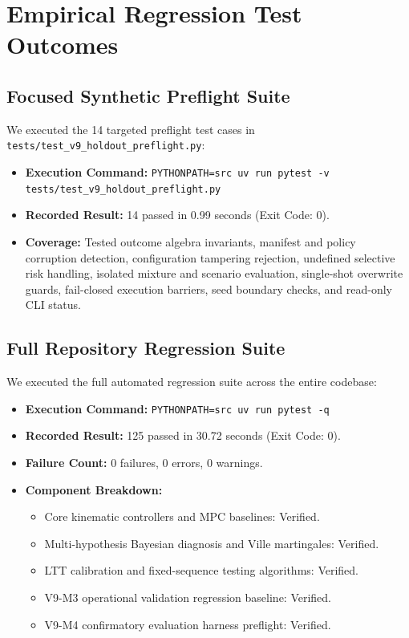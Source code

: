 \documentclass[10pt,a4paper]{article}
\begin{document}
\section{Empirical Regression Test Outcomes}

\subsection{Focused Synthetic Preflight Suite}
We executed the 14 targeted preflight test cases in \texttt{tests/test\_v9\_holdout\_preflight.py}:
\begin{itemize}
    \item \textbf{Execution Command:} \texttt{PYTHONPATH=src uv run pytest -v tests/test\_v9\_holdout\_preflight.py}
    \item \textbf{Recorded Result:} 14 passed in 0.99 seconds (Exit Code: 0).
    \item \textbf{Coverage:} Tested outcome algebra invariants, manifest and policy corruption detection, configuration tampering rejection, undefined selective risk handling, isolated mixture and scenario evaluation, single-shot overwrite guards, fail-closed execution barriers, seed boundary checks, and read-only CLI status.
\end{itemize}

\subsection{Full Repository Regression Suite}
We executed the full automated regression suite across the entire codebase:
\begin{itemize}
    \item \textbf{Execution Command:} \texttt{PYTHONPATH=src uv run pytest -q}
    \item \textbf{Recorded Result:} 125 passed in 30.72 seconds (Exit Code: 0).
    \item \textbf{Failure Count:} 0 failures, 0 errors, 0 warnings.
    \item \textbf{Component Breakdown:}
    \begin{itemize}
        \item Core kinematic controllers and MPC baselines: Verified.
        \item Multi-hypothesis Bayesian diagnosis and Ville martingales: Verified.
        \item LTT calibration and fixed-sequence testing algorithms: Verified.
        \item V9-M3 operational validation regression baseline: Verified.
        \item V9-M4 confirmatory evaluation harness preflight: Verified.
    \end{itemize}
\end{itemize}
\end{document}
